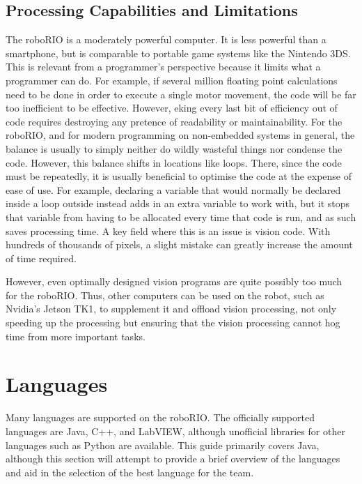 \documentclass[]{report}
\begin{document}
\subsection{Processing Capabilities and Limitations}
The roboRIO is a moderately powerful computer.
It is less powerful than a smartphone, but is comparable to portable game systems like the Nintendo 3DS.
This is relevant from a programmer's perspective because it limits what a programmer can do.
For example, if several million floating point calculations need to be done in order to execute a single motor movement, the code will be far too inefficient to be effective.
However, eking every last bit of efficiency out of code requires destroying any pretence of readability or maintainability.
For the roboRIO, and for modern programming on non-embedded systems in general, the balance is usually to simply neither do wildly wasteful things nor condense the code.
However, this balance shifts in locations like loops. There, since the code must be repeatedly, it is usually beneficial to optimise the code at the expense of ease of use.
For example, declaring a variable that would normally be declared inside a loop outside instead adds in an extra variable to work with, but it stops that variable from having to be allocated every time that code is run, and as such saves processing time.
A key field where this is an issue is vision code.
With hundreds of thousands of pixels, a slight mistake can greatly increase the amount of time required.

However, even optimally designed vision programs are quite possibly too much for the roboRIO.
Thus, other computers can be used on the robot, such as Nvidia's Jetson TK1, to supplement it and offload vision processing, not only speeding up the processing but ensuring that the vision processing cannot hog time from more important tasks.


\section{Languages}
Many languages are supported on the roboRIO.
The officially supported languages are Java, C++, and LabVIEW, although unofficial libraries for other languages such as Python are available.
This guide primarily covers Java, although this section will attempt to provide a brief overview of the languages and aid in the selection of the best language for the team.
\end{document}
